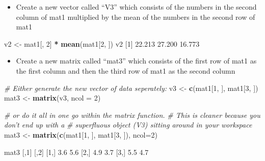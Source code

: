 \documentclass[
]{book}
\newenvironment{Shaded}{\begin{snugshade}}{\end{snugshade}}
\newcommand{\CommentTok}[1]{\textcolor[rgb]{0.56,0.35,0.01}{\textit{#1}}}
\newcommand{\DataTypeTok}[1]{\textcolor[rgb]{0.13,0.29,0.53}{#1}}
\newcommand{\DecValTok}[1]{\textcolor[rgb]{0.00,0.00,0.81}{#1}}
\newcommand{\FloatTok}[1]{\textcolor[rgb]{0.00,0.00,0.81}{#1}}
\newcommand{\KeywordTok}[1]{\textcolor[rgb]{0.13,0.29,0.53}{\textbf{#1}}}
\newcommand{\NormalTok}[1]{#1}
\newcommand{\OperatorTok}[1]{\textcolor[rgb]{0.81,0.36,0.00}{\textbf{#1}}}
\newcommand{\StringTok}[1]{\textcolor[rgb]{0.31,0.60,0.02}{#1}}
\providecommand{\tightlist}{%
  \setlength{\itemsep}{0pt}\setlength{\parskip}{0pt}}
\begin{document}
\begin{itemize}
\tightlist
\item
  Create a new vector called ``V3'' which consists of the numbers in the second column of mat1 multiplied by the mean of the numbers in the second row of mat1
\end{itemize}

\begin{Shaded}
\begin{Highlighting}[]
\NormalTok{v2 <-}\StringTok{ }\NormalTok{mat1[, }\DecValTok{2}\NormalTok{] }\OperatorTok{*}\StringTok{ }\KeywordTok{mean}\NormalTok{(mat1[}\DecValTok{2}\NormalTok{, ])}
\NormalTok{v2}
\NormalTok{[}\DecValTok{1}\NormalTok{] }\FloatTok{22.213} \FloatTok{27.200} \FloatTok{16.773}
\end{Highlighting}
\end{Shaded}

\begin{itemize}
\tightlist
\item
  Create a new matrix called ``mat3'' which consists of the first row of mat1 as the first column and then the third row of mat1 as the second column
\end{itemize}

\begin{Shaded}
\begin{Highlighting}[]
\CommentTok{# Either generate the new vector of data seperately:}
\NormalTok{v3 <-}\StringTok{ }\KeywordTok{c}\NormalTok{(mat1[}\DecValTok{1}\NormalTok{, ], mat1[}\DecValTok{3}\NormalTok{, ])}
\NormalTok{mat3 <-}\StringTok{ }\KeywordTok{matrix}\NormalTok{(v3, }\DataTypeTok{ncol =} \DecValTok{2}\NormalTok{)        }

\CommentTok{# or do it all in one go within the matrix function.}
\CommentTok{# This is cleaner because you don't end up with a }
\CommentTok{# superfluous object (V3) sitting around in your workspace}
\NormalTok{mat3 <-}\StringTok{ }\KeywordTok{matrix}\NormalTok{(}\KeywordTok{c}\NormalTok{(mat1[}\DecValTok{1}\NormalTok{, ], mat1[}\DecValTok{3}\NormalTok{, ]), }\DataTypeTok{ncol=}\DecValTok{2}\NormalTok{)}


\NormalTok{mat3       }
\NormalTok{     [,}\DecValTok{1}\NormalTok{] [,}\DecValTok{2}\NormalTok{]}
\NormalTok{[}\DecValTok{1}\NormalTok{,]  }\FloatTok{3.6}  \FloatTok{5.6}
\NormalTok{[}\DecValTok{2}\NormalTok{,]  }\FloatTok{4.9}  \FloatTok{3.7}
\NormalTok{[}\DecValTok{3}\NormalTok{,]  }\FloatTok{5.5}  \FloatTok{4.7}
\end{Highlighting}
\end{Shaded}
\end{document}
